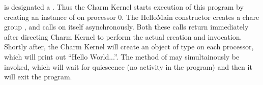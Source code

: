  is designated a . Thus the Charm Kernel starts 
execution of this program by creating an instance of  on 
processor 0. The HelloMain constructor creates a chare group , and 
calls  on itself asynchronously.  Both these calls return immediately
after directing Charm Kernel to perform the actual creation and invocation. 
Shortly after, the Charm Kernel will create an object of type
 on each processor, which will print out 
``Hello World...''.  The  method 
of  may simultainously be invoked, which  
will wait for quiescence (no activity in 
the program) and then it will exit the program.







